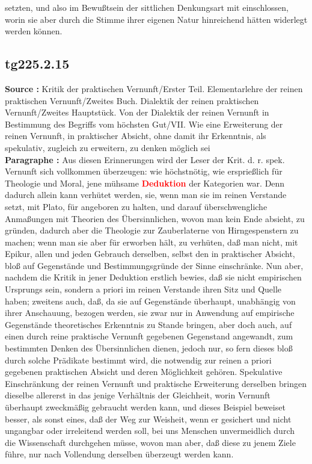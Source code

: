 \documentclass[a4paper,12pt,twoside]{book}
\newcommand{\match}[1]{\textcolor{red}{\textbf{#1}}}
\begin{document}
setzten, und also im Bewußtsein der sittlichen Denkungsart mit einschlossen, worin sie aber durch die Stimme ihrer eigenen Natur hinreichend hätten widerlegt werden können. 
	
	\subsection*{tg225.2.15} 
	\textbf{Source : }Kritik der praktischen Vernunft/Erster Teil. Elementarlehre der reinen praktischen Vernunft/Zweites Buch. Dialektik der reinen praktischen Vernunft/Zweites Hauptstück. Von der Dialektik der reinen Vernunft in Bestimmung des Begriffs vom höchsten Gut/VII. Wie eine Erweiterung der reinen Vernunft, in praktischer Absicht, ohne damit ihr Erkenntnis, als spekulativ, zugleich zu erweitern, zu denken möglich sei\\  
	
	\noindent\textbf{Paragraphe : }
	Aus diesen Erinnerungen wird der Leser der Krit. d. r. spek. Vernunft sich vollkommen überzeugen: wie höchstnötig, wie ersprießlich für Theologie und Moral, jene mühsame \match{Deduktion} der Kategorien war. Denn dadurch allein kann verhütet werden, sie, wenn man sie im reinen Verstande setzt, mit Plato, für angeboren zu halten, und darauf überschwengliche Anmaßungen mit Theorien des Übersinnlichen, wovon man kein Ende absieht, zu gründen, dadurch aber die Theologie zur Zauberlaterne von Hirngespenstern zu machen; wenn man sie aber für erworben hält, zu verhüten, daß man nicht, mit Epikur, allen und jeden Gebrauch derselben, selbst den in praktischer Absicht, bloß auf Gegenstände und Bestimmungsgründe der Sinne einschränke. Nun aber, nachdem die Kritik in jener Deduktion erstlich bewies, daß sie nicht empirischen Ursprungs sein, sondern a priori im reinen Verstande ihren Sitz und Quelle haben; zweitens auch, daß, da sie auf Gegenstände überhaupt, unabhängig von ihrer Anschauung, bezogen werden, sie zwar nur in Anwendung auf empirische Gegenstände theoretisches Erkenntnis zu Stande bringen, aber doch auch, auf einen durch reine praktische Vernunft gegebenen Gegenstand angewandt, zum bestimmten Denken des Übersinnlichen dienen, jedoch nur, so fern dieses bloß durch solche Prädikate bestimmt wird, die notwendig zur reinen a priori gegebenen praktischen Absicht und deren Möglichkeit gehören. Spekulative Einschränkung der reinen Vernunft und praktische Erweiterung derselben bringen dieselbe allererst in das jenige Verhältnis der Gleichheit, worin Vernunft überhaupt zweckmäßig gebraucht werden kann, und dieses Beispiel beweiset besser, als sonst eines, daß der Weg zur Weisheit, wenn er gesichert und nicht ungangbar oder irreleitend werden soll, bei uns Menschen unvermeidlich durch die Wissenschaft durchgehen müsse, wovon man aber, daß diese zu jenem Ziele führe, nur nach Vollendung derselben überzeugt werden kann. 
	
\end{document}
